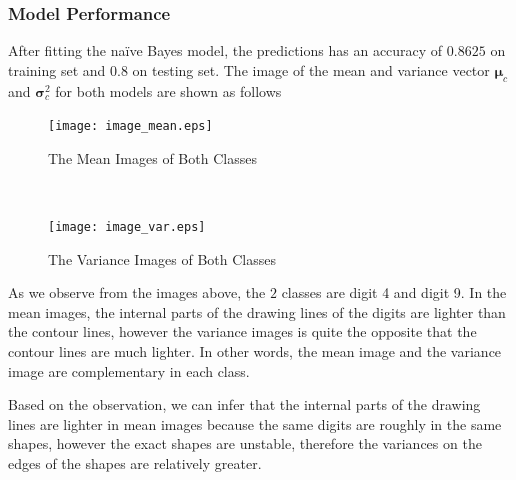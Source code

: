 \documentclass[10pt]{article}
\begin{document}
\subsubsection{Model Performance}
After fitting the naïve Bayes model, the predictions has an accuracy of $0.8625$ on training set and $0.8$ on testing set. The image of the mean and variance vector $\boldsymbol{\mu}_c$ and $\boldsymbol{\sigma}_c^2$ for both models are shown as follows
\begin{figure}[H]
\centering
\begin{minipage}[b]{0.45\textwidth}
\centering
\texttt{[image: image\_mean.eps]}
\caption{The Mean Images of Both Classes}
\label{image_mean}
\end{minipage}
\
\begin{minipage}[b]{0.45\textwidth}
\centering
\texttt{[image: image\_var.eps]}
\caption{The Variance Images of Both Classes}
\label{image_var}
\end{minipage}
\end{figure}
As we observe from the images above, the $2$ classes are digit 4 and digit 9. In the mean images, the internal parts of the drawing lines of the digits are lighter than the contour lines, however the variance images is quite the opposite that the contour lines are much lighter. In other words, the mean image and the variance image are complementary in each class.\par
Based on the observation, we can infer that the internal parts of the drawing lines are lighter in mean images because the same digits are roughly in the same shapes, however the exact shapes are unstable, therefore the variances on the edges of the shapes are relatively greater.
\end{document}
